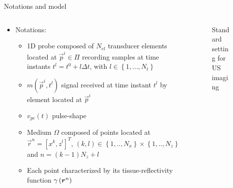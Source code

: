 {\begin{block}{Notations and model}
	\begin{columns} %
		\begin{column}{.48\textwidth} %
			\begin{itemize}
				\item Notations:
				\begin{itemize}
					\item 1D probe composed of $N_{el}$ transducer elements located at $\vec{p}^i \in \Pi$ recording samples at time instants $t^l = t^0 + l \Delta t$, with $l \in \left\lbrace 1,...,N_t \right\rbrace$
					\item $m\left(\vec{p}^i, t^l\right)$ signal received at time instant $t^l$ by element located at $\vec{p}^i$
					\item $v_{pe} \left(t\right)$ pulse-shape
					\item Medium $\Omega$ composed of points located at $\vec{r}^n=\left[x^k, z^l\right]^T$, $\left(k, l\right) \in \left\lbrace 1,..,N_x\right\rbrace \times \left\lbrace 1,..,N_z\right\rbrace$ and $n=(k-1)N_z + l$
					\item Each point characterized by its tissue-reflectivity function $\gamma\left(\bm{r}^n\right)$
				\end{itemize}
			\end{itemize}
		\end{column}
		
		\begin{column}{.52\textwidth} %
			\centering
			\begin{figure}
				{\footnotesize
				}
				\caption{Standard setting for US imaging}
			\end{figure}
		\end{column}
	\end{columns} %
	

\end{block}}
